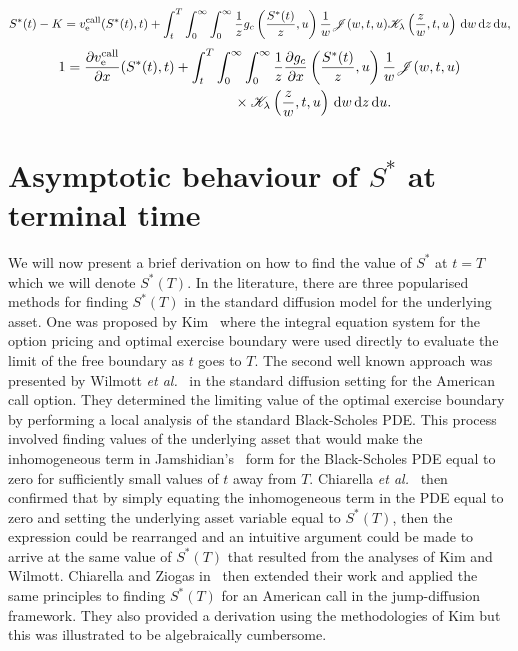 		\begin{equation}
        		\label{eqn:inteqn3}
        		\begin{split}
        		S^*(t) - K = v_{\text{e}}^{\text{call}}(S^*(t),t) + \int_t^T \int_0^\infty \int_0^\infty \frac{1}{z}g_c\left(\frac{S^*(t)}{z},u\right) \frac{1}{w}\mathscr J(w,t,u)\mathscr K_\lambda\left( \frac{z}{w},t,u \right) \, \mathrm d w \, \mathrm d z \, \mathrm d u,
        		\end{split}
        	\end{equation}
 		\begin{equation}
			\label{eqn:inteqn2}
			\begin{split}
			1 &=  \frac{\partial v_{\text{e}}^{\text{call}}}{\partial x}( S^*(t),t) + \int_t^T \int_0^\infty \int_0^\infty \frac{1}{z}\frac{\partial g_c}{\partial x}\left(\frac{ S^*(t)}{z},u\right) \frac{1}{w}\mathscr J(w,t,u) \\
			&\qquad\qquad\qquad\qquad\qquad\qquad \times \mathscr K_\lambda\left( \frac{z}{w},t,u \right) \, \mathrm d w \, \mathrm d z \, \mathrm d u.
			\end{split}
		\end{equation}       	
        	
        	\section{Asymptotic behaviour of $S^*$ at terminal time}
        	We will now present a brief derivation on how to find the value of $S^*$ at $t = T$ which we will denote $S^*(T)$. In the literature, there are three popularised methods for finding $S^*(T)$ in the standard diffusion model for the underlying asset. One was proposed by Kim~\cite{Kim1990} where the integral equation system for the option pricing and optimal exercise boundary were used directly to evaluate the limit of the free boundary as $t$ goes to $T$. The second well known approach was presented by Wilmott \emph{et al.}~\cite{Wilmott1993} in the standard diffusion setting for the American call option. They determined the limiting value of the optimal exercise boundary by performing a local analysis of the standard Black-Scholes PDE. This process involved finding values of the underlying asset that would make the inhomogeneous term in Jamshidian's~\cite{Jamshidian1992} form for the Black-Scholes PDE equal to zero for sufficiently small values of $t$ away from $T$. Chiarella \emph{et al.}~\cite{Chiarella2004} then confirmed that by simply equating the inhomogeneous term in the PDE equal to zero and setting the underlying asset variable equal to $S^*(T)$, then the expression could be rearranged and an intuitive argument could be made to arrive at the same value of $S^*(T)$ that resulted from the analyses of Kim and Wilmott. Chiarella and Ziogas in~\cite{Chiarella2006} then extended their work and applied the same principles to finding $S^*(T)$ for an American call in the jump-diffusion framework. They also provided a derivation using the methodologies of Kim but this was illustrated to be algebraically cumbersome.
        	
